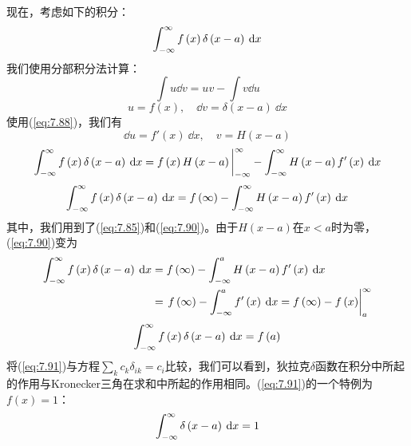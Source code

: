     现在，考虑如下的积分：
    \begin{equation*}
        \int_{-\infty}^{\infty} f\left(x\right)\delta\left(x-a\right)\:\dd x
    \end{equation*}
    我们使用分部积分法计算：
    \begin{equation*}
        \int u \dd v = uv - \int v \dd u
    \end{equation*}
    \begin{equation*}
        u = f\left(x\right), \quad \dd v = \delta\left(x-a\right)\:\dd x
    \end{equation*}
    使用(\ref{eq:7.88})，我们有
    \begin{equation*}
        \dd u = f'\left(x\right)\:\dd x, \quad v = H\left(x-a\right)
    \end{equation*}
    \begin{equation*}
        \int_{-\infty}^{\infty} f\left(x\right)\delta\left(x-a\right)\:\dd x = f\left(x\right)H\left(x-a\right)\bigg|_{-\infty}^{\infty} - \int_{-\infty}^{\infty} H\left(x-a\right)f'\left(x\right)\:\dd x
    \end{equation*}
    \begin{equation}
        \int_{-\infty}^{\infty} f\left(x\right)\delta\left(x-a\right)\:\dd x = f\left(\infty\right) - \int_{-\infty}^{\infty} H\left(x-a\right)f'\left(x\right)\:\dd x
        \label{eq:7.90}
    \end{equation}
    其中，我们用到了(\ref{eq:7.85})和(\ref{eq:7.90})。由于$H\left(x-a\right)$在$x < a$时为零，(\ref{eq:7.90})变为
    \begin{equation*}
        \begin{aligned}
            \int_{-\infty}^{\infty} f\left(x\right)\delta\left(x-a\right)\:\dd x & = f\left(\infty\right) - \int_{-\infty}^{a}H\left(x-a\right)f'\left(x\right)\:\dd x \\
            & = \left.f\left(\infty\right) - \int_{-\infty}^{a}f'\left(x\right)\:\dd x =  f\left(\infty\right) - f\left(x\right) \right|_{a}^{\infty}
        \end{aligned}
    \end{equation*}
    \begin{equation}
        \int_{-\infty}^{\infty} f\left(x\right)\delta\left(x-a\right)\:\dd x = f\left(a\right)
        \label{eq:7.91}
    \end{equation}
    将(\ref{eq:7.91})与方程$\sum_{k}c_k\delta_{ik} = c_i$比较，我们可以看到，狄拉克$\delta$函数在积分中所起的作用与Kronecker三角在求和中所起的作用相同。(\ref{eq:7.91})的一个特例为$f\left(x\right) = 1$：
    \begin{equation*}
        \int_{-\infty}^{\infty} \delta\left(x-a\right)\:\dd x = 1
    \end{equation*}

